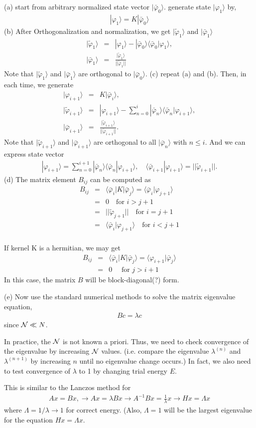 \documentclass[11pt]{article}
\newcommand{\bea}{\begin{eqnarray}}
\newcommand{\eea}{\end{eqnarray}}
\newcommand{\no}{\nonumber \\}
\newcommand{\la}{\langle}
\newcommand{\ra}{\rangle}
\begin{document}
(a) start from arbitrary normalized state vector $|\bar{\varphi}_0\ra$. 
    generate state $|{\varphi}_1\ra$ by,
    \bea 
    |{\varphi}_1\ra=K|\bar{\varphi}_0\ra
    \eea 
(b) After Orthogonalization and normalization, we get $|\tilde{\varphi}_1\ra$ 
  and $|\bar{\varphi}_1\ra  $
  \bea 
  |\tilde{\varphi}_1\ra&=&|\varphi_1\ra -|\bar{\varphi}_0\ra \la \bar{\varphi}_0|\varphi_1\ra,\no  
  |\bar{\varphi}_1\ra&=&\frac{|\tilde{\varphi}_1\ra}{||\tilde{\varphi}_1||}
  \eea 
  Note that $|\tilde{\varphi}_1\ra$ and $|\bar{\varphi}_1\ra$ are orthogonal to $|\bar{\varphi}_0\ra$.
(c) repeat (a) and (b). Then, in each time, we generate
  \bea 
  |\varphi_{i+1}\ra &=& K|\bar{\varphi}_{i}\ra,\no 
  |\tilde{\varphi}_{i+1}\ra&=&|\varphi_{i+1}\ra
                             -\sum_{n=0}^{i} |\bar{\varphi}_n\ra \la \bar{\varphi}_n|\varphi_{i+1}\ra,\no 
  |\bar{\varphi}_{i+1}\ra&=&\frac{|\tilde{\varphi}_{i+1}\ra}{||\tilde{\varphi}_{i+1}||}.
  \eea   
  Note that $|\tilde{\varphi}_{i+1}\ra$ and $|\bar{\varphi}_{i+1}\ra$  are
  orthogonal to all $|\bar{\varphi}_{n}\ra $ with $n\le i$.
  And we can express state vector
  \bea 
  |\varphi_{i+1}\ra=\sum_{n=0}^{i+1} |\bar{\varphi}_n\ra \la \bar{\varphi}_n|\varphi_{i+1}\ra,
  \quad \la \bar{\varphi}_{i+1}|\varphi_{i+1}\ra=||\tilde{\varphi}_{i+1}||. 
  \eea 
(d) The matrix element $B_{ij}$ can be computed as
  \bea 
  B_{ij}&=&\la \bar{\varphi}_i|K|\bar{\varphi}_j\ra=\la \bar{\varphi}_i|{\varphi}_{j+1}\ra \no 
        &=& 0\quad \mbox{for } i> j+1 \no 
        &=&  ||\tilde{\varphi}_{j+1}||\quad \mbox{for } i= j+1 \no 
        &=& \la \bar{\varphi}_i|\varphi_{j+1}\ra\quad \mbox{for } i< j+1 \no 
  \eea 
  
  If kernel K is a hermitian, we may get
  \bea 
  B_{ij}&=&\la \bar{\varphi}_i|K|\bar{\varphi}_j\ra=\la{\varphi}_{i+1}|\bar{\varphi}_{j}\ra \no 
        &=& 0 \quad \mbox{ for } j > i+1  
  \eea 
  In this case, the matrix $B$ will be block-diagonal(?) form.
  
(e) Now use the standard numerical methods to solve the matrix eigenvalue equation,
  \bea 
  B c=\lambda c
  \eea 
  since ${\cal N}\ll N$.
  
In practice, the ${\cal N}$ is not known a priori. Thus, we need to check convergence
of the eigenvalue by increasing ${\cal N}$ values. (i.e. compare the eigenvalue 
$\lambda^{(n)}$ and $\lambda^{(n+1)}$ by increasing $n$ until no eigenvalue change occurs.) 
In fact, we also need to test convergence of $\lambda$ to 1 by changing trial energy $E$.

This is similar to the Lanczos method for
\bea 
A x= B x, \to A x= \lambda B x \to A^{-1} B x=\frac{1}{\lambda} x
 \to H x=\Lambda x
\eea 
where $\Lambda=1/\lambda\to 1$ for correct energy. (Also, $\Lambda=1$ will be
the largest eigenvalue for the equation $H x=\Lambda x$. 
\end{document}
